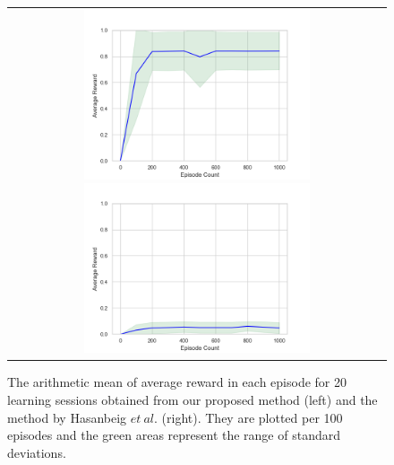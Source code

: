 \documentclass[a4j,12pt,oneside,openany,english,dvipdfmx]{jsbook}
\begin{document}
\begin{figure}[tbp]
 \centering
 \begin{tabular}{c}
  \begin{minipage}{0.5\hsize}
     \centering
     \includegraphics[bb=0 0 461 346, height = 5cm, width=7cm]{ep_1000_it_10000_MDP3_gamma_095_re2_ini22_nts_c095_20times.png}
 \end{minipage}

 \begin{minipage}{0.5\hsize}
   \centering
   \includegraphics[bb=0 0 461 346, height = 5cm, width=7cm]{ep_1000_it_10000_MDP3_gamma_095_nts_c095_abate_20times.png}
 \end{minipage}
\end{tabular}
 \caption{The arithmetic mean of average reward in each episode for 20 learning sessions obtained from our proposed method (left) and the method by Hasanbeig $et\ al.$\cite{HAK2019} (right). They are plotted per 100 episodes and the green areas represent the range of standard deviations.}
 \label{result}
\end{figure}
\end{document}

